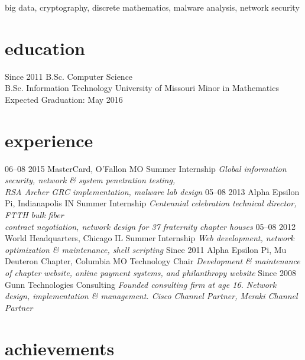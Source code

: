 \documentclass[print]{gunn-resume}
\begin{document}
big data, cryptography, discrete mathematics, malware analysis, network security
\section{education}

\begin{entrylist}
  \entry
    {Since 2011}
    {B.Sc. {\normalfont Computer Science}\\
    B.Sc. {\normalfont Information Technology}}
    {University of Missouri}
    {Minor in Mathematics\\
    Expected Graduation: May 2016}
\end{entrylist}

\section{experience}

\begin{entrylist}
 \entry
    {06–08 2015}
    {MasterCard, O'Fallon MO}
    {Summer Internship}
    {\emph{Global information security, network \& system penetration testing,\\RSA Archer GRC implementation, malware lab design}}
  \entry
    {05–08 2013}
    {Alpha Epsilon Pi, Indianapolis IN}
    {Summer Internship}
    {\emph{Centennial celebration technical director, FTTH bulk fiber\\ contract negotiation, network design for 37 fraternity chapter houses}}
  \entry
    {05–08 2012}
    {World Headquarters, Chicago IL}
    {Summer Internship}
    {\emph{Web development, network optimization \& maintenance, shell scripting}}
      \entry
    {Since 2011}
    {Alpha Epsilon Pi, Mu Deuteron Chapter, Columbia MO}
    {Technology Chair}
    {\emph{Development \& maintenance of chapter website, online payment systems, and philanthropy website}}
  \entry
    {Since 2008}
    {Gunn Technologies}
    {Consulting}
    {\emph{Founded consulting firm at age 16. Network design, implementation \& management. Cisco Channel Partner, Meraki Channel Partner}}
\end{entrylist}

\section{achievements}
\end{document}
